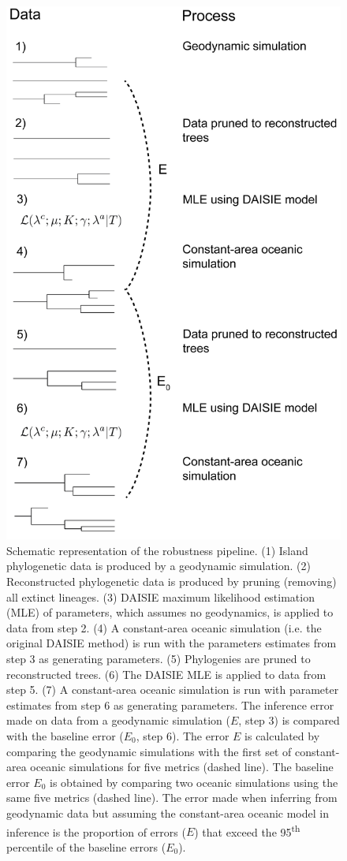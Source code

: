 \documentclass{article}
\begin{document}
\begin{figure}
    \centering
    \includegraphics{JBI-21-0508_Fig2.png}
    \caption{Schematic representation of the robustness pipeline. (1) Island phylogenetic data is produced by a geodynamic simulation. (2) Reconstructed phylogenetic data is produced by pruning (removing) all extinct lineages. (3) DAISIE maximum likelihood estimation (MLE) of parameters, which assumes no geodynamics, is applied to data from step 2. (4) A constant-area oceanic simulation (i.e. the original DAISIE method) is run with the parameters estimates from step 3 as generating parameters. (5) Phylogenies are pruned to reconstructed trees. (6) The DAISIE MLE is applied to data from step 5. (7) A constant-area oceanic simulation is run with parameter estimates from step 6 as generating parameters. The inference error made on data from a geodynamic simulation ($E$, step 3) is compared with the baseline error ($E_0$, step 6). The error $E$ is calculated by comparing the geodynamic simulations with the first set of constant-area oceanic simulations for five metrics (dashed line). The baseline error $E_0$ is obtained by comparing two oceanic simulations using the same five metrics (dashed line). The error made when inferring from geodynamic data but assuming the constant-area oceanic model in inference is the proportion of errors ($E$) that exceed the 95\textsuperscript{th} percentile of the baseline errors ($E_0$).}

\end{figure}
\end{document}
